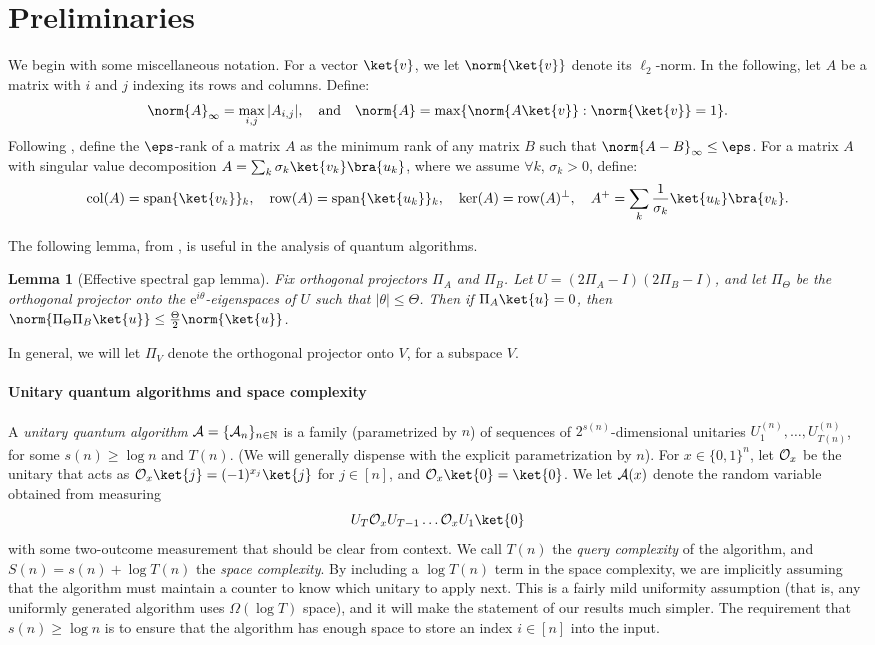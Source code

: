 \documentclass[11pt]{article}
\numberwithin{equation}{section}
\newtheorem{lemma}[theorem]{Lemma}
\theoremstyle{definition}
\theoremstyle{plain}
\newcommand{\N}{\mathbb N}
\newcommand{\eee}{\mathrm e}
\begin{document}
\section{Preliminaries}\label{sec:prelim}


We begin with some miscellaneous notation. For a vector $\ket{v}$, we let $\norm{\ket{v}}$ denote its $\ell_2$-norm.
In the following, let $A$ be a matrix with $i$ and $j$ indexing its rows and columns. Define:
$$\norm{A}_\infty=\max_{i,j}|A_{i,j}|,
\quad\mbox{and}\quad\norm{A}=\max\{\norm{A\ket{v}}:\norm{\ket{v}}=1\}.$$
Following \cite{ALSV13}, define the $\eps$-rank of a matrix $A$ as the minimum rank of any matrix $B$ such that $\norm{A-B}_{\infty}\leq \eps$. 
For a matrix $A$ with singular value decomposition $A=\sum_k\sigma_k\ket{v_k}\bra{u_k}$, where we assume $\forall k$, $\sigma_k>0$, define:
$$\mathrm{col}(A)=\mathrm{span}\{\ket{v_k}\}_k,
\quad \mathrm{row}(A)=\mathrm{span}\{\ket{u_k}\}_k,
\quad \ker(A)=\mathrm{row}(A)^\bot,
\quad A^+=\sum_k\frac{1}{\sigma_k}\ket{u_k}\bra{v_k}.$$

\noindent The following lemma, from \cite{LMR+11}, is useful in the analysis of quantum algorithms.
\begin{lemma}[Effective spectral gap lemma]\label{lem:gap}
  Fix orthogonal projectors $\Pi_A$ and $\Pi_B$. Let $U=(2\Pi_A-I)(2\Pi_B-I)$, and let $\Pi_\Theta$ be the orthogonal projector onto the $\eee^{i\theta}$-eigenspaces of $U$ such that $|\theta|\leq \Theta$. Then if $\Pi_A\ket{u}=0$,
then %
%
$\norm{\Pi_\Theta\Pi_B\ket{u}}\leq \frac{\Theta}{2}\norm{\ket{u}}$. 
\end{lemma}
\noindent In general, we will let $\Pi_V$ denote the orthogonal projector onto $V$, for a subspace $V$. 



\paragraph{Unitary quantum algorithms and space complexity}

A \emph{unitary quantum algorithm} ${\cal A}=\{{\cal A}_n\}_{n\in\N}$ is a family (parametrized by $n$) of sequences of $2^{s(n)}$-dimensional unitaries $U_1^{(n)},\dots,U_{T(n)}^{(n)}$, for some $s(n)\geq \log n$ and $T(n)$. (We will generally dispense with the explicit parametrization by $n$). For $x\in\{0,1\}^n$, let ${\cal O}_x$ be the unitary that acts as ${\cal O}_x\ket{j}=(-1)^{x_j}\ket{j}$ for $j\in [n]$, and ${\cal O}_x\ket{0}=\ket{0}$. 
We let ${\cal A}(x)$ denote the random variable obtained from measuring 
$$U_T{\cal O}_x U_{T-1}\dots {\cal O}_xU_1\ket{0}$$
with some two-outcome measurement that should be clear from context. We call $T(n)$ the \emph{query complexity} of the algorithm, and $S(n)=s(n)+\log T(n)$ the \emph{space complexity}. By including a $\log T(n)$ term in the space complexity, we are implicitly assuming that the algorithm must maintain a counter to know which unitary to apply next. This is a fairly mild uniformity assumption (that is, any uniformly generated algorithm uses $\Omega(\log T)$ space), and it will make the statement of our results much simpler. 
The requirement that $s(n)\geq \log n$ is to ensure that the algorithm has enough space to store an index $i\in [n]$ into the input. 
\end{document}
